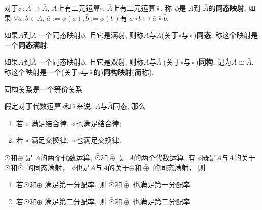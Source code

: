 \begin{Definition}[同态映射]
对于$\phi: A \rightarrow \bar{A}$, $A$上有二元运算$\circ$, $\bar{A}$上有二元运算$\bar{\circ}$. 称 $\phi$是 $A$到 $\bar{A}$的\textbf{同态映射}, 如果
$\forall a, b \in A$, $\bar{a} := \phi(a), \bar{b} := \phi(b)$有 
$ a \circ b \mapsto \bar{a} \, \bar{\circ} \, \bar{b}$.
\end{Definition}


\begin{Definition}[同态满射、同态]
如果$A$到$\bar{A}\;${}\;一个同态映射$\phi$, 且它是满射, 则称$A$与$\bar{A}$\;(关于$\circ$与$\bar{\circ}$)\textbf{同态}. 称这个映射是一个\textbf{同态满射}.
\end{Definition}


\begin{Definition}[同构映射、同构]
如果$A$到$\bar{A}\;${}\;一个同态映射$\phi$, 且它是双射, 则称$A$与$\bar{A}\;$(关于$\circ$与$\bar{\circ}$)\textbf{同构}, 记为$A \cong
 \bar{A}$. 称这个映射是一个(关于$\circ$与$\bar{\circ}$的)\textbf{同构映射}(简称).
\end{Definition}

\begin{Proposition}
同构关系是一个等价关系.
\end{Proposition}


\begin{Theorem}
假定对于代数运算$\circ$和$\bar{\circ}$来说, $A$与$\bar{A}$同态, 那么
\begin{enumerate}[(1)]
\item 若 $\circ$ 满足结合律, $\bar{\circ}$也满足结合律;
\item 若 $\circ$ 满足交换律, $\bar{\circ}$也满足交换律.
\end{enumerate}
\end{Theorem}

\begin{Theorem}
$ \astrosun $和$ \oplus $ 是 $A$的两个代数运算, 
$ \bar{\astrosun} $和$\bar{\oplus} $ 是 $\bar{A}$的两个代数运算,
有
$\phi$既是$A$与$\bar{A}$的关于$ \astrosun $和$\bar{\astrosun}$ 的同态满射，
$\phi$也是$A$与$\bar{A}$的关于$ \oplus $和$\bar{\oplus}$ 的同态满射，
则 
\begin{enumerate}[(1)]
\item 若$ \astrosun$和$ \oplus $ 满足第一分配率, 则 $ \bar{\astrosun} $和$\bar{\oplus} $ 也满足第一分配率.
\item 若$ \astrosun$和$\oplus $ 满足第二分配率, 则 $ \bar{\astrosun} $和$\bar{\oplus} $ 也满足第二分配率.
\end{enumerate}
\end{Theorem}



